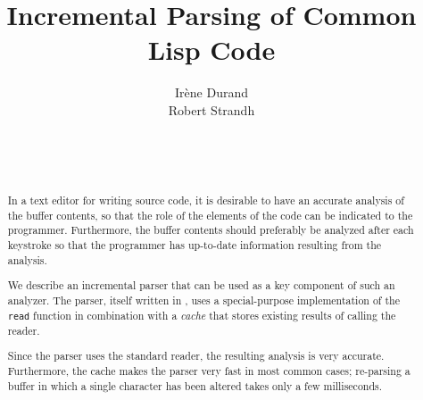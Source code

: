 \documentclass{sig-alternate-05-2015}
\begin{document}
\title{Incremental Parsing of Common Lisp Code}
\author{\alignauthor
Irène Durand\\
Robert Strandh\\
\\
\\
\\
}


\maketitle

\begin{abstract}
In a text editor for writing \commonlisp{} \cite{ansi:common:lisp}
source code, it is desirable to have an accurate analysis of the
buffer contents, so that the role of the elements of the code can be
indicated to the programmer.  Furthermore, the buffer contents should
preferably be analyzed after each keystroke so that the programmer has
up-to-date information resulting from the analysis.

We describe an incremental parser that can be used as a key component
of such an analyzer.  The parser, itself written in \commonlisp{},
uses a special-purpose implementation of the \commonlisp{}
\texttt{read} function in combination with a \emph{cache} that stores
existing results of calling the reader.

Since the parser uses the standard \commonlisp{} reader, the resulting
analysis is very accurate.  Furthermore, the cache makes the parser
very fast in most common cases; re-parsing a buffer in which a single
character has been altered takes only a few milliseconds.
\end{abstract}
\end{document}
